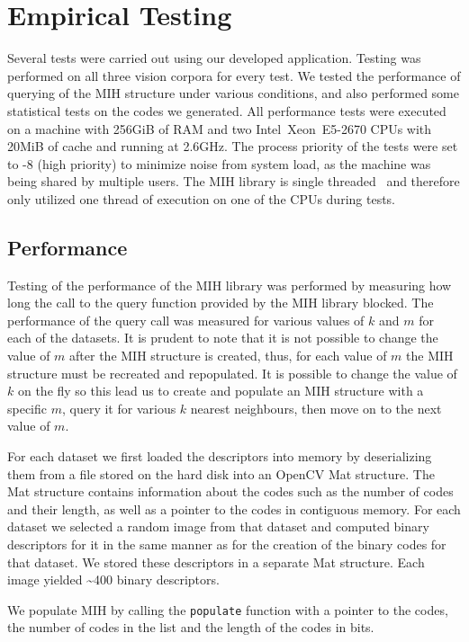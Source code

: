\section{Empirical Testing}
Several tests were carried out using our developed application. Testing was performed on all three vision corpora for every test. We tested the performance of querying of the MIH structure under various conditions, and also performed some statistical tests on the codes we generated. All performance tests were executed on a machine with 256GiB of RAM and two Intel\textregistered ~Xeon\textregistered ~E5-2670 CPUs with 20MiB of cache and running at 2.6GHz. The process priority of the tests were set to -8 (high priority) to minimize noise from system load, as the machine was being shared by multiple users. The MIH library is single threaded~\cite{norouzi2012fast}  and therefore only utilized one thread of execution on one of the CPUs during tests.

\subsection{Performance}
Testing of the performance of the MIH library was performed by measuring how long the call to the query function provided by the MIH library blocked. The performance of the query call was measured for various values of $k$ and $m$ for each of the datasets. It is prudent to note that it is not possible to change the value of $m$ after the MIH structure is created, thus, for each value of $m$ the MIH structure must be recreated and repopulated. It is possible to change the value of $k$ on the fly so this lead us to create and populate an MIH structure with a specific $m$, query it for various $k$ nearest neighbours, then move on to the next value of $m$.

For each dataset we first loaded the descriptors into memory by deserializing them from a file stored on the hard disk into an OpenCV Mat structure. The Mat structure contains information about the codes such as the number of codes and their length, as well as a pointer to the codes in contiguous memory. For each dataset we selected a random image from that dataset and computed binary descriptors for it in the same manner as for the creation of the binary codes for that dataset. We stored these descriptors in a separate Mat structure. Each image yielded \textasciitilde400 binary descriptors.

We populate MIH by calling the \texttt{populate} function with a pointer to the codes, the number of codes in the list and the length of the codes in bits.

